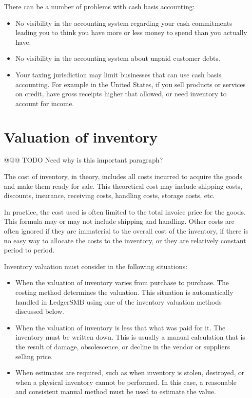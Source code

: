 There can be a number of problems with \gls{cash basis} accounting:
\begin{itemize}
        \item No visibility in the accounting system regarding your cash commitments leading
        you to think you have more or less money to spend than you actually have.
        \item No visibility in the accounting system about unpaid customer debts.
        \item Your taxing jurisdiction may limit businesses that can use cash basis accounting.
        For example in the United States, if you sell products or services on credit,
        have gross receipts higher that allowed, or need inventory to account for income.
\end{itemize}

\section{Valuation of inventory}
\label{sec-accounting-valuation-inventory}

@@@ TODO Need why is this important paragraph?

The cost of inventory, in theory, includes all costs incurred to acquire the goods and make 
them ready for sale. This theoretical cost may include shipping costs, discounts, insurance, 
receiving costs, handling costs, storage costs, etc.

In practice, the cost used is often limited to the total invoice price for the goods.
This formula may or may not include shipping and handling.
Other costs are often ignored if they are immaterial to the overall cost of the inventory, if there
is no easy way to allocate the costs to the inventory, or they are relatively constant period to period.

Inventory valuation must consider in the following situations:
\begin{itemize}
        \item When the valuation of inventory varies from purchase to purchase. The costing method
        determines the valuation.  This situation is automatically handled in LedgerSMB using one of the
        inventory valuation methods discussed below.
        \item When the valuation of inventory is less that what was paid for it. The inventory must
        be written down. This is usually a manual calculation that is the result of damage, obsolescence, 
        or decline in the vendor or suppliers selling price.
        \item When estimates are required, such as when inventory is stolen, destroyed, or when a physical inventory
        cannot be performed. In this case, a reasonable and consistent manual method must be used to 
        estimate the value. 
\end{itemize}

